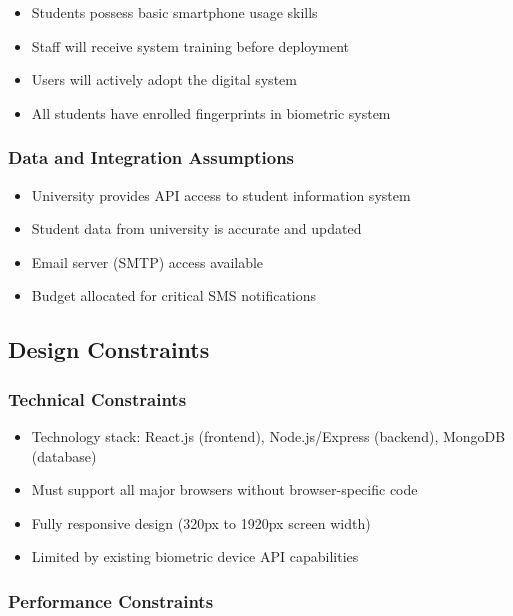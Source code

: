 \documentclass[12pt]{article}
\begin{document}
\begin{itemize}
\item Students possess basic smartphone usage skills
\item Staff will receive system training before deployment
\item Users will actively adopt the digital system
\item All students have enrolled fingerprints in biometric system
\end{itemize}

\subsubsection{Data and Integration Assumptions}

\begin{itemize}
\item University provides API access to student information system
\item Student data from university is accurate and updated
\item Email server (SMTP) access available
\item Budget allocated for critical SMS notifications
\end{itemize}

\subsection{Design Constraints}

\subsubsection{Technical Constraints}

\begin{itemize}
\item Technology stack: React.js (frontend), Node.js/Express (backend), MongoDB (database)
\item Must support all major browsers without browser-specific code
\item Fully responsive design (320px to 1920px screen width)
\item Limited by existing biometric device API capabilities
\end{itemize}

\subsubsection{Performance Constraints}
\end{document}
